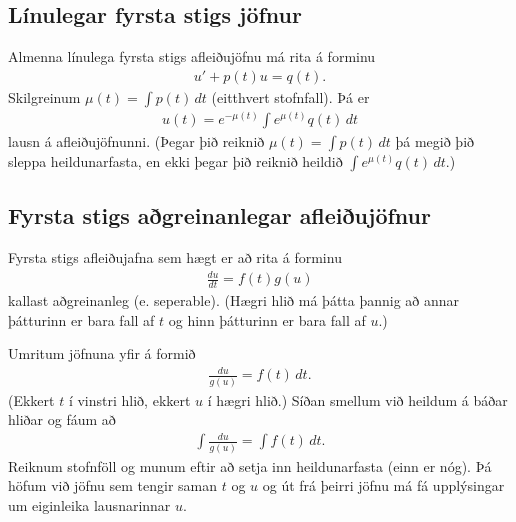 \documentclass[a4paper,10pt,icelandic]{sphinxmanual}
\begin{document}
\subsection{Línulegar fyrsta stigs jöfnur}
\label{\detokenize{Kafli06:linulegar-fyrsta-stigs-jofnur}}
Almenna línulega fyrsta stigs afleiðujöfnu má rita á forminu
\begin{equation*}
\begin{split}u'+p(t)u=q(t).\end{split}
\end{equation*}
Skilgreinum \(\mu(t)=\int p(t)\,dt\) (eitthvert stofnfall). Þá er
\begin{equation*}
\begin{split}u(t)=e^{-\mu(t)}\int e^{\mu(t)}q(t)\,dt\end{split}
\end{equation*}
lausn á afleiðujöfnunni. (Þegar þið reiknið \(\mu(t)=\int p(t)\,dt\) þá megið þið sleppa heildunarfasta, en ekki þegar þið reiknið heildið \(\int e^{\mu(t)}q(t)\,dt\).)


\subsection{Fyrsta stigs aðgreinanlegar afleiðujöfnur}
\label{\detokenize{Kafli06:fyrsta-stigs-agreinanlegar-afleiujofnur}}
Fyrsta stigs afleiðujafna sem hægt er að rita á forminu
\begin{equation*}
\begin{split}\frac{du}{dt}=f(t)g(u)\end{split}
\end{equation*}
kallast aðgreinanleg (e. seperable). (Hægri hlið má þátta þannig að annar þátturinn er bara fall af \(t\) og hinn þátturinn er bara fall af \(u\).)

Umritum jöfnuna yfir á formið
\begin{equation*}
\begin{split}\frac{du}{g(u)}=f(t)\,dt.\end{split}
\end{equation*}
(Ekkert \(t\) í vinstri hlið, ekkert \(u\) í hægri hlið.) Síðan smellum við heildum á báðar hliðar og fáum að
\begin{equation*}
\begin{split}\int\frac{du}{g(u)}=\int f(t)\,dt.\end{split}
\end{equation*}
Reiknum stofnföll og munum eftir að setja inn heildunarfasta (einn er nóg). Þá höfum við jöfnu sem tengir saman \(t\) og \(u\) og út frá þeirri jöfnu má fá upplýsingar um eiginleika lausnarinnar \(u\).
\end{document}

